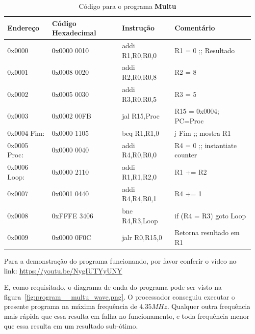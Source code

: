 \documentclass[12pt]{article}
\begin{document}
\begin{table}[H]
    \centering
    \caption{Código para o programa \textbf{Multu}}
    \begin{tabular}{|l|l|l|l|}\hline
        \textbf{Endereço} & \textbf{Código Hexadecimal} & \textbf{Instrução} & \textbf{Comentário} \\\hline
        0x0000       & 0x0000 0010 & addi R1,R0,R0,0 & R1 = 0 ;; Resultado           \\\hline
        0x0001       & 0x0008 0020 & addi R2,R0,R0,8 & R2 = 8                        \\\hline
        0x0002       & 0x0005 0030 & addi R3,R0,R0,5 & R3 = 5                        \\\hline
        0x0003       & 0x0002 00FB & jal R15,Proc    & R15 = 0x0004; PC=Proc         \\\hline
        0x0004 Fim:  & 0x0000 1105 & beq R1,R1,0     & j Fim ;; mostra R1            \\\hline
        0x0005 Proc: & 0x0000 0040 & addi R4,R0,R0,0 & R4 = 0 ;; instantiate counter \\\hline
        0x0006 Loop: & 0x0000 2110 & addi R1,R1,R2,0 & R1 += R2                      \\\hline
        0x0007       & 0x0001 0440 & addi R4,R4,R0,1 & R4 += 1                       \\\hline
        0x0008       & 0xFFFE 3406 & bne  R4,R3,Loop & if (R4 \!= R3) goto Loop      \\\hline
        0x0009       & 0x0000 0F0C & jalr R0,R15,0   & Retorna resultado em R1       \\\hline
    \end{tabular}\label{tab:programs:multu}
\end{table}

Para a demonstração do programa funcionando, por favor conferir o vídeo no link:
\href{https://youtu.be/NygIUTYyUNY}{https://youtu.be/NygIUTYyUNY}

E, como requisitado, o diagrama de onda do programa pode ser visto na
figura~\ref{fig:program__multu_wave.png}. O processador conseguiu executar o
presente programa na máxima frequência de $4.35MHz$. Qualquer outra frequência
mais rápida que essa resulta em falha no funcionamento, e toda frequência menor
que essa resulta em um resultado sub-ótimo.
\end{document}
